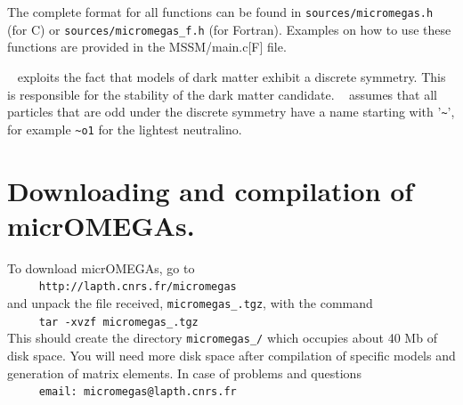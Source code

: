 \documentclass[12pt,a4paper]{article}
\begin{document}
The complete format  for all functions can be found in
\verb|sources/micromegas.h| (for C) or
\verb|sources/micromegas_f.h| (for Fortran). Examples on how to use these functions are provided   
in the MSSM/main.c[F] file. 
 
 
 \micro~ exploits the fact that models of dark matter exhibit a discrete symmetry. This is responsible 
 for the stability of the dark matter candidate.  \micro~ assumes that all particles that are odd under the discrete symmetry have
 a name starting with '\verb|~|', for example \verb|~o1| for the lightest  neutralino.



\section {Downloading and compilation of micrOMEGAs.}
To   download  micrOMEGAs, go to    \\  
\verb|     http://lapth.cnrs.fr/micromegas|\\
and unpack the file received, \verb|micromegas_|\VERSION\verb|.tgz|, with the command\\
\verb|     tar -xvzf micromegas_|\VERSION\verb|.tgz|\\
This should create the directory \verb|micromegas_|\VERSION\verb|/| which occupies about 40
Mb of disk space. You will need more disk space after compilation of
specific models and generation of matrix elements.
In case of problems and questions\\
\verb|     email: micromegas@lapth.cnrs.fr|\\
\end{document}
